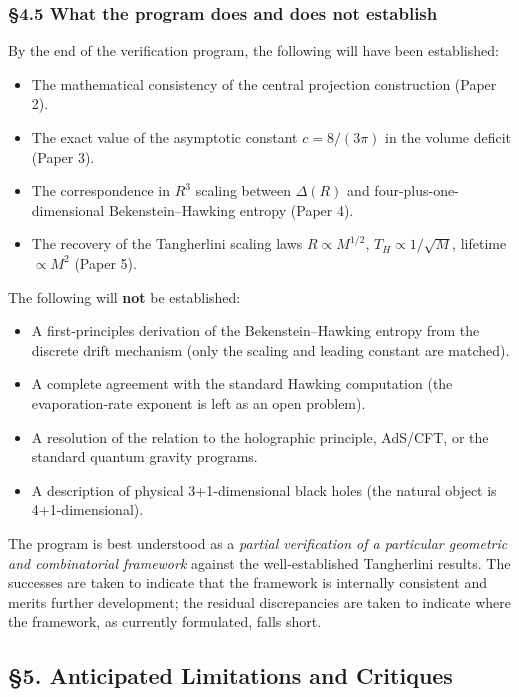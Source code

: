 \documentclass[a4paper,11pt]{article}
\theoremstyle{definition}
\providecommand{\tightlist}{\setlength{\itemsep}{0pt}\setlength{\parskip}{0pt}}
\begin{document}
\subsubsection{§4.5 What the program does and does not
establish}\label{what-the-program-does-and-does-not-establish}

By the end of the verification program, the following will have been
established:

\begin{itemize}
\tightlist
\item
  The mathematical consistency of the central projection construction
  (Paper 2).
\item
  The exact value of the asymptotic constant \(c = 8/(3\pi)\) in the
  volume deficit (Paper 3).
\item
  The correspondence in \(R^3\) scaling between \(\Delta(R)\) and
  four-plus-one-dimensional Bekenstein--Hawking entropy (Paper 4).
\item
  The recovery of the Tangherlini scaling laws \(R \propto M^{1/2}\),
  \(T_H \propto 1/\sqrt{M}\), lifetime \(\propto M^2\) (Paper 5).
\end{itemize}

The following will \textbf{not} be established:

\begin{itemize}
\tightlist
\item
  A first-principles derivation of the Bekenstein--Hawking entropy from
  the discrete drift mechanism (only the scaling and leading constant
  are matched).
\item
  A complete agreement with the standard Hawking computation (the
  evaporation-rate exponent is left as an open problem).
\item
  A resolution of the relation to the holographic principle, AdS/CFT, or
  the standard quantum gravity programs.
\item
  A description of physical 3+1-dimensional black holes (the natural
  object is 4+1-dimensional).
\end{itemize}

The program is best understood as a \emph{partial verification of a
particular geometric and combinatorial framework} against the
well-established Tangherlini results. The successes are taken to
indicate that the framework is internally consistent and merits further
development; the residual discrepancies are taken to indicate where the
framework, as currently formulated, falls short.

\subsection{§5. Anticipated Limitations and
Critiques}\label{anticipated-limitations-and-critiques}
\end{document}
